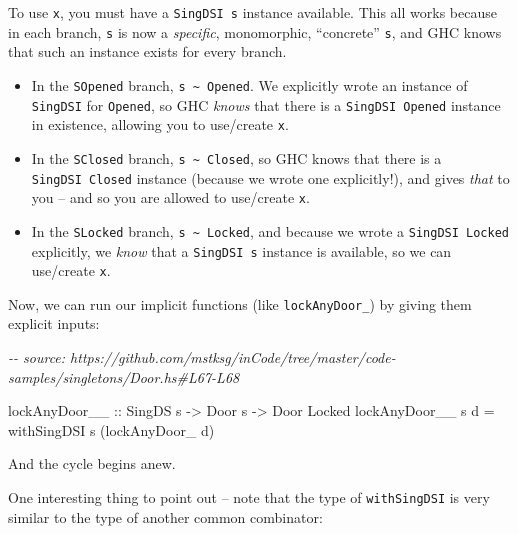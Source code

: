 \documentclass[]{article}
\newenvironment{Shaded}{}{}
\newcommand{\CommentTok}[1]{\textcolor[rgb]{0.38,0.63,0.69}{\textit{#1}}}
\newcommand{\DataTypeTok}[1]{\textcolor[rgb]{0.56,0.13,0.00}{#1}}
\newcommand{\FunctionTok}[1]{\textcolor[rgb]{0.02,0.16,0.49}{#1}}
\newcommand{\NormalTok}[1]{#1}
\newcommand{\OtherTok}[1]{\textcolor[rgb]{0.00,0.44,0.13}{#1}}
\begin{document}
To use \texttt{x}, you must have a \texttt{SingDSI\ s} instance available. This
all works because in each branch, \texttt{s} is now a \emph{specific},
monomorphic, ``concrete'' \texttt{s}, and GHC knows that such an instance exists
for every branch.

\begin{itemize}
\tightlist
\item
  In the \texttt{SOpened} branch,
  \texttt{s\ \textasciitilde{}\ \textquotesingle{}Opened}. We explicitly wrote
  an instance of \texttt{SingDSI} for \texttt{\textquotesingle{}Opened}, so GHC
  \emph{knows} that there is a \texttt{SingDSI\ \textquotesingle{}Opened}
  instance in existence, allowing you to use/create \texttt{x}.
\item
  In the \texttt{SClosed} branch,
  \texttt{s\ \textasciitilde{}\ \textquotesingle{}Closed}, so GHC knows that
  there is a \texttt{SingDSI\ \textquotesingle{}Closed} instance (because we
  wrote one explicitly!), and gives \emph{that} to you -- and so you are allowed
  to use/create \texttt{x}.
\item
  In the \texttt{SLocked} branch,
  \texttt{s\ \textasciitilde{}\ \textquotesingle{}Locked}, and because we wrote
  a \texttt{SingDSI\ \textquotesingle{}Locked} explicitly, we \emph{know} that a
  \texttt{SingDSI\ s} instance is available, so we can use/create \texttt{x}.
\end{itemize}

Now, we can run our implicit functions (like \texttt{lockAnyDoor\_}) by giving
them explicit inputs:

\begin{Shaded}
\begin{Highlighting}[]
\CommentTok{{-}{-} source: https://github.com/mstksg/inCode/tree/master/code{-}samples/singletons/Door.hs\#L67{-}L68}

\OtherTok{lockAnyDoor\_\_ ::} \DataTypeTok{SingDS}\NormalTok{ s }\OtherTok{{-}>} \DataTypeTok{Door}\NormalTok{ s }\OtherTok{{-}>} \DataTypeTok{Door} \DataTypeTok{\textquotesingle{}Locked}
\NormalTok{lockAnyDoor\_\_ s d }\OtherTok{=}\NormalTok{ withSingDSI s (lockAnyDoor\_ d)}
\end{Highlighting}
\end{Shaded}

And the cycle begins anew.

One interesting thing to point out -- note that the type of \texttt{withSingDSI}
is very similar to the type of another common combinator:

\begin{Shaded}
\end{Shaded}
\end{document}
